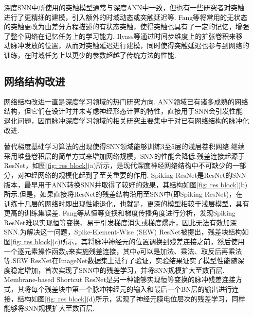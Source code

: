 \documentclass{SCIS2020cn}
\begin{document}
深度SNN中所使用的突触模型通常与深度ANN中一致，但也有一些研究者对突触进行了更精细的建模，引入额外的时域动态或突触延迟等.
Fang等\cite{SNN-IIR}将常用的无状态的突触更改为由差分方程描述的有状态突触，使得突触也具有了一定的记忆，增强了整个网络在记忆任务上的学习能力.
Ilyass等\cite{hammouamri2024learning}通过时间步维度上的扩张卷积来移动脉冲发放的位置，从而对突触延迟进行建模，同时使得突触延迟也参与到网络的训练，在时域任务上以更少的参数超越了传统方法的性能.



\subsection{网络结构改进}%
网络结构改进一直是深度学习领域的热门研究方向. ANN领域已有诸多成熟的网络结构，但它们在设计时并未考虑神经形态计算的特性，直接用于SNN会引发性能退化问题，因而脉冲深度学习领域的相关研究主要集中于对已有网络结构的脉冲化改进. 


替代梯度基础学习算法的出现使得SNN领域能够训练3至5层的浅层卷积网络.继续采用堆叠卷积层的简单方式来增加网络规模，SNN的性能会降低.残差连接\cite{he2016deep}起源于ResNet\cite{he2016deep}，如图\ref{fig: res block}(a)所示，是现代深度神经网络结构中不可缺少的一部分，对神经网络的规模化起到了至关重要的作用.
Spiking ResNet是ResNet的SNN版本，最早用于ANN转换SNN\cite{hu2020spiking}并取得了较好的效果，其结构如图\ref{fig: res block}(b)所示.但是，如果直接将ResNet的残差结构沿用至SNN中(即Spiking ResNet)，在训练十几层的网络时即出现性能退化\cite{zheng2020going}，也就是，更深的模型相较于浅层模型，具有更高的训练集误差. Fang等\cite{SEWResNet}从恒等变换和梯度传播角度进行分析，发现Spiking ResNet难以实现恒等变换、易于引发梯度消失或梯度爆炸，因此无法有效加深SNN.为解决这一问题，Spike-Element-Wise (SEW) ResNet\cite{SEWResNet}被提出，残差块结构如图\ref{fig: res block}(c)所示，其将脉冲神经元的位置调换到残差连接之前，然后使用一个逐元素操作函数$g$来实施残差连接，其中$g$可以是加法、乘法、取反后再乘法等.SEW ResNet在ImageNet数据集上进行了验证，实验结果证实了模型性能随深度稳定增加，首次实现了SNN中的残差学习，并将SNN规模扩大至数百层.
Membrane-based Shortcut ResNet\cite{10428029}是另一种能够实现恒等变换的脉冲残差连接方式，其将每个残差块中第一个脉冲神经元的输入和最后一个BN层的输出进行连接，结构如图\ref{fig: res block}(d)所示，实现了神经元膜电位层次的残差学习，同样能够将SNN规模扩大至数百层.
\end{document}
